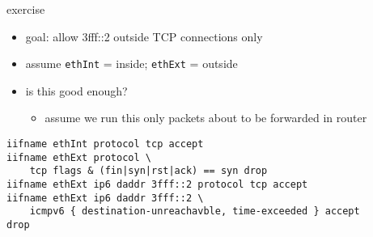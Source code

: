 \begin{frame}[fragile]{exercise}
\begin{itemize}
\item goal: allow 3fff::2 outside TCP connections only
\item assume \texttt{ethInt} = inside; \texttt{ethExt} = outside
\item is this good enough?
    \begin{itemize}
    \item assume we run this only packets about to be forwarded in router
    \end{itemize}
\end{itemize}
\begin{Verbatim}[fontsize=\fontsize{11}{12}]
iifname ethInt protocol tcp accept
iifname ethExt protocol \
    tcp flags & (fin|syn|rst|ack) == syn drop
iifname ethExt ip6 daddr 3fff::2 protocol tcp accept
iifname ethExt ip6 daddr 3fff::2 \
    icmpv6 { destination-unreachavble, time-exceeded } accept
drop
\end{Verbatim}
\end{frame}

